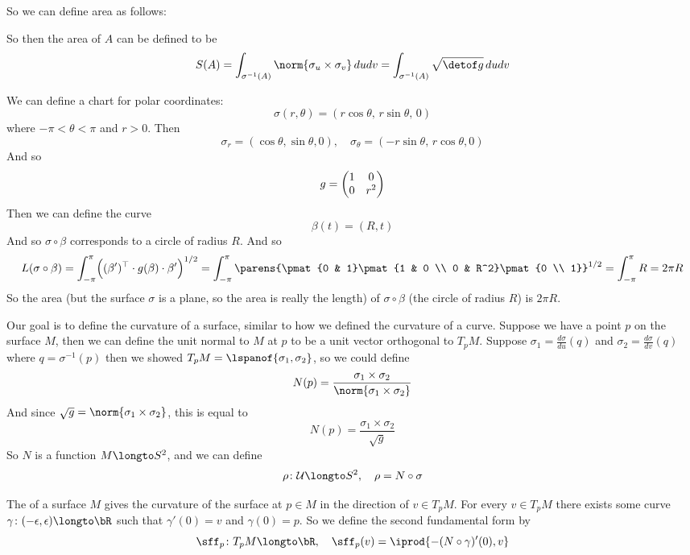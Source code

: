 So we can define area as follows:

\begin{defn*}

    So then the area of $A$ can be defined to be
    \[ S(A) = \int_{\sigma^{-1}(A)}\norm{\sigma_u\times\sigma_v}\,dudv = \int_{\sigma^{-1}(A)}\sqrt{\detof g}\,dudv \]

\end{defn*}

\begin{exam*}

    We can define a chart for polar coordinates:
    \[ \sigma(r,\theta) = (r\cos\theta,\,r\sin\theta,\,0) \]
    where $-\pi<\theta<\pi$ and $r>0$.
    Then
    \[ \sigma_r = (\cos\theta,\sin\theta,0),\quad \sigma_\theta = (-r\sin\theta,\,r\cos\theta,0) \]
    And so
    \[ g = \begin{pmatrix}1 & 0 \\ 0 & r^2\end{pmatrix} \]
    Then we can define the curve
    \[ \beta(t) = (R,t) \]
    And so $\sigma\circ\beta$ corresponds to a circle of radius $R$.
    And so
    \[ L(\sigma\circ\beta) = \int_{-\pi}^\pi \Bigl((\beta')^\top\cdot g(\beta)\cdot\beta'\Bigr)^{1/2} = \int_{-\pi}^\pi \parens{\pmat{0 & 1}\pmat{1 & 0 \\ 0 & R^2}\pmat{0 \\ 1}}^{1/2}
    = \int_{-\pi}^\pi R = 2\pi R \]
    So the area (but the surface $\sigma$ is a plane, so the area is really the length) of $\sigma\circ\beta$ (the circle of radius $R$) is $2\pi R$.

\end{exam*}

Our goal is to define the curvature of a surface, similar to how we defined the curvature of a curve.
Suppose we have a point $p$ on the surface $M$, then we can define the unit normal to $M$ at $p$ to be a unit vector orthogonal to $T_pM$.
Suppose $\sigma_1=\frac{d\sigma}{du}(q)$ and $\sigma_2=\frac{d\sigma}{dv}(q)$ where $q=\sigma^{-1}(p)$ then we showed $T_pM=\lspanof{\sigma_1,\sigma_2}$, so we could define
\[ N(p) = \frac{\sigma_1\times\sigma_2}{\norm{\sigma_1\times\sigma_2}} \]
And since $\sqrt g=\norm{\sigma_1\times\sigma_2}$, this is equal to
\[ N(p) = \frac{\sigma_1\times\sigma_2}{\sqrt g} \]
So $N$ is a function $M\longto S^2$, and we can define
\[ \rho\colon\mU\longto S^2,\quad \rho = N\circ\sigma \]

\begin{defn*}

    The  of a surface $M$ gives the curvature of the surface at $p\in M$ in the direction of $v\in T_pM$.
    For every $v\in T_pM$ there exists some curve $\gamma\colon(-\epsilon,\epsilon)\longto\bR$ such that $\gamma'(0)=v$ and $\gamma(0)=p$.
    So we define the second fundamental form by
    \[ \sff_p\colon T_pM\longto\bR,\quad \sff_p(v) = \iprod{-(N\circ\gamma)'(0),v} \]

\end{defn*}

